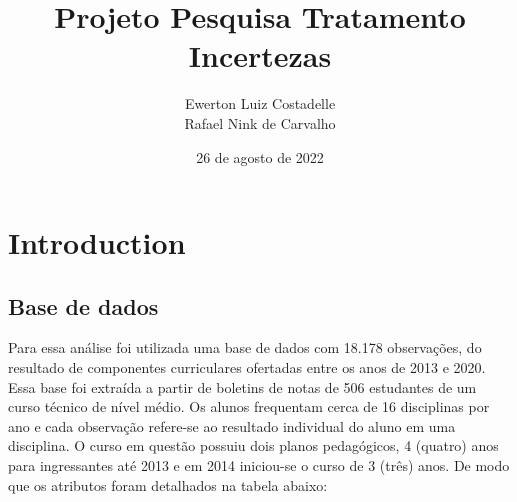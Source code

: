 \documentclass{article}
\title{Projeto Pesquisa Tratamento Incertezas}
\author{Ewerton Luiz Costadelle \\ Rafael Nink de Carvalho}
\date{26 de agosto de 2022}
\begin{document}
\maketitle

\section{Introduction}


\subsection{Base de dados}\label{base_de_dados}

Para essa análise foi utilizada uma base de dados com 18.178 observações, do resultado de componentes curriculares ofertadas entre os anos de 2013 e 2020. Essa base foi extraída a partir de boletins de notas de 506 estudantes de um curso técnico de nível médio. Os alunos frequentam cerca de 16 disciplinas por ano e cada observação refere-se ao resultado individual do aluno em uma disciplina. O curso em questão possuiu dois planos pedagógicos, 4 (quatro) anos para ingressantes até 2013 e em 2014 iniciou-se o curso de 3 (três) anos. De modo que os atributos foram detalhados na tabela abaixo: \\
\end{document}
